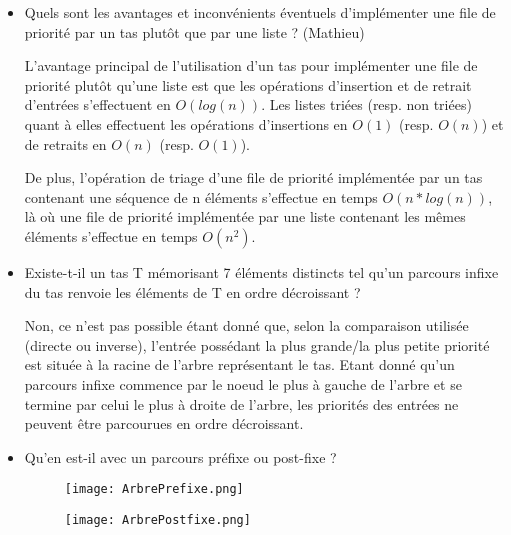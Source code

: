 \begin{itemize}
\item Quels sont les avantages et inconvénients éventuels d’implémenter une file de priorité par un tas plutôt que par une liste ? (Mathieu)\newline

L'avantage principal de l'utilisation d'un tas pour implémenter une file de priorité plutôt qu'une liste est que les opérations d'insertion et de retrait d'entrées s'effectuent en $O(log(n))$. Les listes triées (resp. non triées) quant à elles effectuent les opérations d'insertions en $O(1)$ (resp. $O(n)$) et de retraits en $O(n)$ (resp. $O(1)$).\newline

De plus, l'opération de triage d'une file de priorité implémentée par un tas contenant une séquence de n éléments s'effectue en temps $O(n*log(n))$, là où une file de priorité implémentée par une liste contenant les mêmes éléments s'effectue en temps $O(n^2)$.\newline

\item Existe-t-il un tas T mémorisant 7 éléments distincts tel qu’un parcours infixe du tas renvoie les éléments de T en ordre décroissant ?\newline

Non, ce n'est pas possible étant donné que, selon la comparaison utilisée (directe ou inverse), l'entrée possédant la plus grande/la plus petite priorité est située à la racine de l'arbre représentant le tas. Etant donné qu'un parcours infixe commence par le noeud le plus à gauche de l'arbre et se termine par celui le plus à droite de l'arbre, les priorités des entrées ne peuvent être parcourues en ordre décroissant.\newline

\item Qu’en est-il avec un parcours préfixe ou post-fixe ?\newline

\begin{figure} [h]
	\centering
	\hspace{-6cm}
	\texttt{[image: ArbrePrefixe.png]}
\end{figure}

\begin{figure} [h]
	\centering
	\vspace{-3.7cm}
	\hspace{6cm}
	\texttt{[image: ArbrePostfixe.png]}
\end{figure}


\end{itemize}
